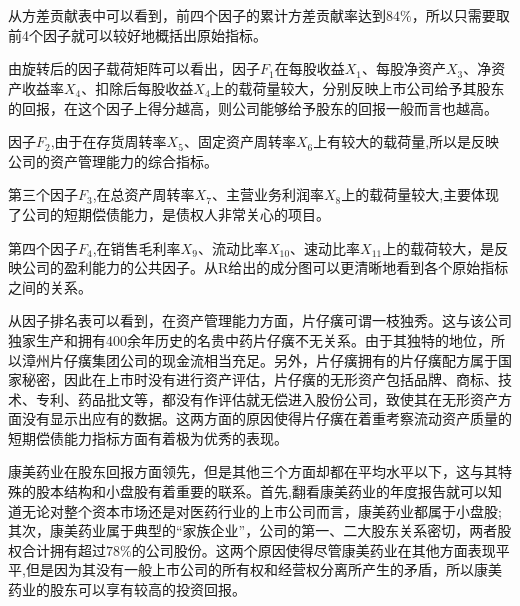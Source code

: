 \documentclass[UTF8,a4paper]{ctexart}
\begin{document}
    
    \begin{center}
    \end{center}
    { \hspace*{\fill} \\}
    
    \begin{center}
    \end{center}
    { \hspace*{\fill} \\}
    
    从方差贡献表中可以看到，前四个因子的累计方差贡献率达到\(84\%\)，所以只需要取前4个因子就可以较好地概括出原始指标。

由旋转后的因子载荷矩阵可以看出，因子\(F_1\)在每股收益\(X_1\)、每股净资产\(X_3\)、净资产收益率\(X_4\)、扣除后每股收益\(X_4\)上的载荷量较大，分别反映上市公司给予其股东的回报，在这个因子上得分越高，则公司能够给予股东的回报一般而言也越高。

因子\(F_2\),由于在存货周转率\(X_5\)、固定资产周转率\(X_6\)上有较大的载荷量,所以是反映公司的资产管理能力的综合指标。

第三个因子\(F_3\),在总资产周转率\(X_7\)、主营业务利润率\(X_8\)上的载荷量较大,主要体现了公司的短期偿债能力，是债权人非常关心的项目。

第四个因子\(F_4\),在销售毛利率\(X_9\)、流动比率\(X_{10}\)、速动比率\(X_{11}\)上的载荷较大，是反映公司的盈利能力的公共因子。从R给出的成分图可以更清晰地看到各个原始指标之间的关系。

    从因子排名表可以看到，在资产管理能力方面，片仔癀可谓一枝独秀。这与该公司独家生产和拥有400余年历史的名贵中药片仔癀不无关系。由于其独特的地位，所以漳州片仔癀集团公司的现金流相当充足。另外，片仔癀拥有的片仔癀配方属于国家秘密，因此在上市时没有进行资产评估，片仔癀的无形资产包括品牌、商标、技术、专利、药品批文等，都没有作评估就无偿进入股份公司，致使其在无形资产方面没有显示出应有的数据。这两方面的原因使得片仔癀在着重考察流动资产质量的短期偿债能力指标方面有着极为优秀的表现。

康美药业在股东回报方面领先，但是其他三个方面却都在平均水平以下，这与其特殊的股本结构和小盘股有着重要的联系。首先,翻看康美药业的年度报告就可以知道无论对整个资本市场还是对医药行业的上市公司而言，康美药业都属于小盘股;其次，康美药业属于典型的``家族企业''，公司的第一、二大股东关系密切，两者股权合计拥有超过\(78\%\)的公司股份。这两个原因使得尽管康美药业在其他方面表现平平,但是因为其没有一般上市公司的所有权和经营权分离所产生的矛盾，所以康美药业的股东可以享有较高的投资回报。


    
    
    
\end{document}
